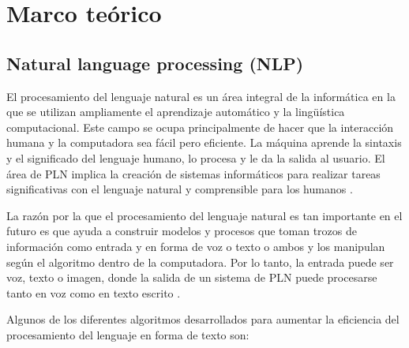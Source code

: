 \documentclass[../Main.tex]{subfiles}
\begin{document}
\section{Marco teórico}
\subsection{Natural language processing (NLP)}
\begin{justify}
El procesamiento del lenguaje natural es un área integral de la informática en la que se utilizan ampliamente el aprendizaje automático y la lingüística computacional. Este campo se ocupa principalmente de hacer que la interacción humana y la computadora sea fácil pero eficiente. La máquina aprende la sintaxis y el significado del lenguaje humano, lo procesa y le da la salida al usuario. El área de PLN implica la creación de sistemas informáticos para realizar tareas significativas con el lenguaje natural y comprensible para los humanos \cite{15}. 
\end{justify}\par
\begin{justify}
La razón por la que el procesamiento del lenguaje natural es tan importante en el futuro es que ayuda a construir modelos y procesos que toman trozos de información como entrada y en forma de voz o texto o ambos y los manipulan según el algoritmo dentro de la computadora. Por lo tanto, la entrada puede ser voz, texto o imagen, donde la salida de un sistema de PLN puede procesarse tanto en voz como en texto escrito \cite{15} .
\end{justify}\par
\begin{justify}
Algunos de los diferentes algoritmos desarrollados para aumentar la eficiencia del procesamiento del lenguaje en forma de texto son:
\end{justify}\par
\end{document}
